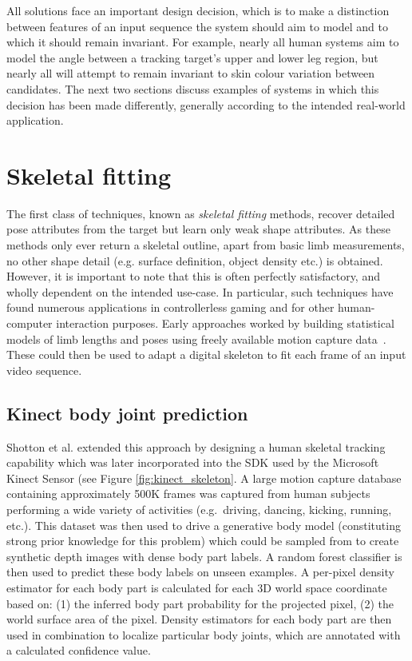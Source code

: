     All solutions face an important design decision, which is to make a distinction between features of an input sequence the system should aim to model and to which it should remain invariant. For example, nearly all human systems aim to model the angle between a tracking target's upper and lower leg region, but nearly all will attempt to remain invariant to skin colour variation between candidates. The next two sections discuss examples of systems in which this decision has been made differently, generally according to the intended real-world application.
 
\section{Skeletal fitting}
    The first class of techniques, known as \textit{skeletal fitting} methods, recover detailed pose attributes from the target but learn only weak shape attributes. As these methods only ever return a skeletal outline, apart from basic limb measurements, no other shape detail (e.g. surface definition, object density etc.) is obtained. However, it is important to note that this is often perfectly satisfactory, and wholly dependent on the intended use-case. In particular, such techniques have found numerous applications in controllerless gaming and for other human-computer interaction purposes. Early approaches worked by building statistical models of limb lengths and poses using freely available motion capture data~\cite{barron2001estimating}. These could then be used to adapt a digital skeleton to fit each frame of an input video sequence. 
    
    \subsection{Kinect body joint prediction}
    Shotton et al. \cite{kinectpaper} extended this approach by designing a human skeletal tracking capability which was later incorporated into the SDK used by the Microsoft Kinect Sensor (see Figure \ref{fig:kinect_skeleton}. A large motion capture database containing approximately 500K frames was captured from human subjects performing a wide variety of activities (e.g.\ driving, dancing, kicking, running, etc.). This dataset was then used to drive a generative body model (constituting strong prior knowledge for this problem) which could be sampled from to create synthetic depth images with dense body part labels. A random forest classifier is then used to predict these body labels on unseen examples. A per-pixel density estimator for each body part is calculated for each 3D world space coordinate based on: (1) the inferred body part probability for the projected pixel, (2) the world surface area of the pixel. Density estimators for each body part are then used in combination to localize particular body joints, which are annotated with a calculated confidence value. 

